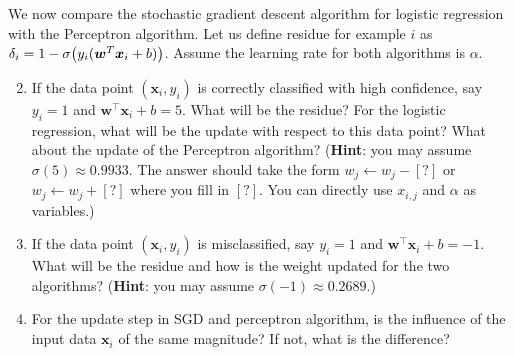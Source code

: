 We now compare the stochastic gradient descent algorithm for logistic regression with the Perceptron algorithm. Let us define residue for example $i$ as $\delta_i=1-\sigma\big(y_i(\boldsymbol{w}^T \boldsymbol{x}_i+b)\big)$. Assume the learning rate for both algorithms is $\alpha$.

\begin{enumerate}
\setcounter{enumi}{1}
\item {} If the data point $(\mathbf{x}_i,y_i)$ is correctly classified with high confidence, say $y_i=1$ and $\mathbf{w}^\top\mathbf{x}_i + b = 5$. What will be the residue? For the logistic regression, what will be the update with respect to this data point? What about the update of the Perceptron algorithm? (\textbf{Hint}: you may assume $\sigma(5)\approx 0.9933$. The answer should take the form $w_j\leftarrow w_j-[?]$ or $w_j\leftarrow w_j+[?]$ where you fill in $[?]$. You can directly use $x_{i,j}$ and $\alpha$ as variables.)


\item {} If the data point $(\mathbf{x}_i,y_i)$ is misclassified, say $y_i=1$ and $\mathbf{w}^\top\mathbf{x}_i + b = -1$. What will be the residue and how is the weight updated for the two algorithms? (\textbf{Hint}: you may assume $\sigma(-1)\approx 0.2689$.)


\item {} For the update step in SGD and perceptron algorithm, is the influence of the input data $\mathbf{x}_i$ of the same magnitude? If not, what is the difference?



\end{enumerate}

